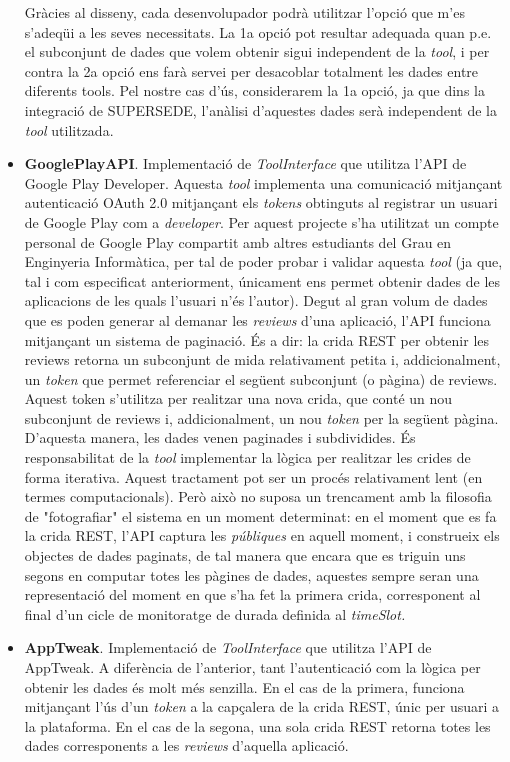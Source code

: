 \begin{itemize}
Gràcies al disseny, cada desenvolupador podrà utilitzar l'opció que m'es s'adeqüi a les seves necessitats. La 1a opció pot resultar adequada quan p.e. el subconjunt de dades que volem obtenir sigui independent de la \textit{tool}, i per contra la 2a opció ens farà servei per desacoblar totalment les dades entre diferents tools. Pel nostre cas d'ús, considerarem la 1a opció, ja que dins la integració de SUPERSEDE, l'anàlisi d'aquestes dades serà independent de la \textit{tool} utilitzada.
\item \textbf{GooglePlayAPI}. Implementació de \textit{ToolInterface} que utilitza l'API de Google Play Developer. Aquesta \textit{tool} implementa una comunicació mitjançant autenticació OAuth 2.0 mitjançant els \textit{tokens} obtinguts al registrar un usuari de Google Play com a \textit{developer}. Per aquest projecte s'ha utilitzat un compte personal de Google Play compartit amb altres estudiants del Grau en Enginyeria Informàtica, per tal de poder probar i validar aquesta \textit{tool} (ja que, tal i com especificat anteriorment, únicament ens permet obtenir dades de les aplicacions de les quals l'usuari n'és l'autor). Degut al gran volum de dades que es poden generar al demanar les \textit{reviews} d'una aplicació, l'API funciona mitjançant un sistema de paginació. És a dir: la crida REST per obtenir les reviews retorna un subconjunt de mida relativament petita i, addicionalment, un \textit{token} que permet referenciar el següent subconjunt (o pàgina) de reviews. Aquest token s'utilitza per realitzar una nova crida, que conté un nou subconjunt de reviews i, addicionalment, un nou \textit{token} per la següent pàgina. D'aquesta manera, les dades venen paginades i subdividides. És responsabilitat de la \textit{tool} implementar la lògica per realitzar les crides de forma iterativa. 
Aquest tractament pot ser un procés relativament lent (en termes computacionals). Però això no suposa un trencament amb la filosofia de "fotografiar" el sistema en un moment determinat: en el moment que es fa la crida REST, l'API captura les \textit{públiques} en aquell moment, i construeix els objectes de dades paginats, de tal manera que encara que es triguin uns segons en computar totes les pàgines de dades, aquestes sempre seran una representació del moment en que s'ha fet la primera crida, corresponent al final d'un cicle de monitoratge de durada definida al \textit{timeSlot.}
\item \textbf{AppTweak}. Implementació de \textit{ToolInterface} que utilitza l'API de AppTweak. A diferència de l'anterior, tant l'autenticació com la lògica per obtenir les dades és molt més senzilla. En el cas de la primera, funciona mitjançant l'ús d'un \textit{token} a la capçalera de la crida REST, únic per usuari a la plataforma. En el cas de la segona, una sola crida REST retorna totes les dades corresponents a les \textit{reviews} d'aquella aplicació.
\end{itemize}

